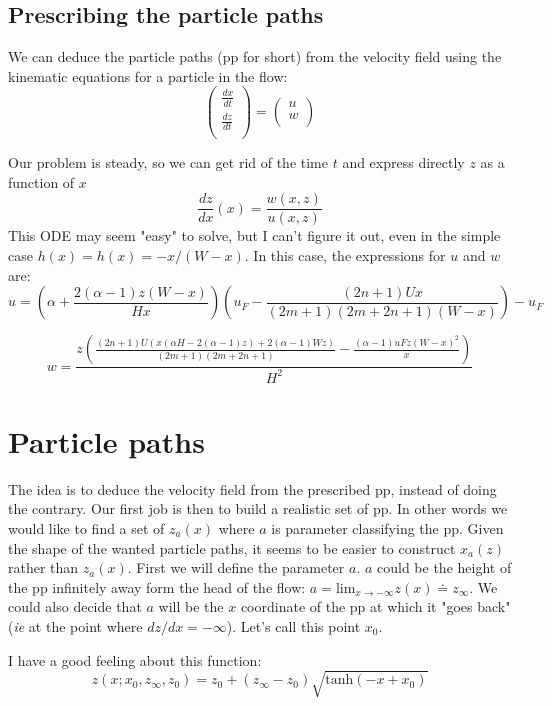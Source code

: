 \documentclass[11pt]{article}
\begin{document}
\subsection{Prescribing the particle paths}
We can deduce the particle paths (pp for short) from the velocity field using the kinematic equations for a particle in the flow:
\[
\begin{pmatrix}
	\frac{dx}{dt} \\
	\frac{dz}{dt} \\
\end{pmatrix}
=
\begin{pmatrix}
	u \\
	w \\
\end{pmatrix}
\]

Our problem is steady, so we can get rid of the time $t$ and express directly $z$ as a function of $x$ 
\[
\frac{dz}{dx}(x) = \frac{w(x, z)}{u(x, z)}
\]
This ODE may seem "easy" to solve, but I can't figure it out, even in the simple case $h(x) = h(x) = - x/ (W - x)$. In this case, the expressions for $u$ and $w$ are:
\[
 u =
 \left(
 \alpha 
 +\frac{2 (\alpha -1) z (W-x)}{H x}
 \right) 
 \left(
 u_F
 -\frac{(2 n+1) U x}{(2 m+1) (2 m+2 n+1) (W-x)}
 \right)-u_F
\]

\[
 w = 
 \frac{z \left(\frac{(2 n+1) U (x (\alpha  H-2 (\alpha -1) z)+2 (\alpha -1) W z)}{(2 m+1) (2 m+2 n+1)}-\frac{(\alpha -1) uF z (W-x)^2}{x}\right)}{H^2}
 \]
 
 
\section{Particle paths}

The idea is to deduce the velocity field from the prescribed pp, instead of doing the contrary.
Our first job is then to build a realistic set of pp. 
In other words we would like to find a set of $z_a(x)$ where $a$ is parameter classifying the pp.
Given the shape of the wanted particle paths, it seems to be easier to construct $x_a(z)$ rather than $z_a(x)$.
First we will define the parameter $a$. $a$ could be the height of the pp infinitely away form the head of the flow: $a = \text{lim}_{x \rightarrow -\infty} z(x) \doteq z_\infty$. We could also decide that $a$ will be the $x$ coordinate of the pp at which it "goes back" (\textit{ie} at the point where $dz/dx = - \infty$). 
Let's call this point $x_0$.

I have a good feeling about this function:
\[
z(x; x_0, z_\infty, z_0) = z_0 + (z_\infty - z_0) \sqrt {\text{tanh} (-x + x_0)}
\]
\end{document}
